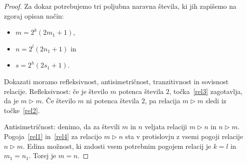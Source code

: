\documentclass[../TG_magistrsko_delo_sections.tex]{subfiles}
\begin{document}
\iffalse %
\begin{proof}
Za dokaz potrebujemo tri poljubna naravna števila, ki jih zapišemo na zgoraj opisan način:
\begin{itemize}
\item $m= 2^k(2m_1 +1)$,
\item $n= 2^l(2n_1 +1)$ in
\item $s=2^h(2s_1+1)$.
\end{itemize}
Dokazati moramo refleksivnost, antisimetričnost, tranzitivnost in sovisnost relacije.
Refleksivnost: če je število $m$ potenca števila $2$, točka~\ref{rel3} zagotavlja, da je $m \triangleright m$. Če število $m$ ni potenca števila $2$, pa relacija $m \triangleright m$ sledi iz točke~\ref{rel2}.

Antisimetričnost: denimo, da za števili $m$ in $n$ veljata relaciji $m \triangleright n$ in $n \triangleright m$. Pogoja~\ref{rel1} in~\ref{rel4} za relacijo $m \triangleright n$ sta v protislovju z vsemi pogoji relacije $n \triangleright m$. Edina možnost, ki zadosti vsem potrebnim pogojem relacij je $k=l$ in $m_1 = n_1$. Torej je $m=n$.


\end{proof}
\end{document}
